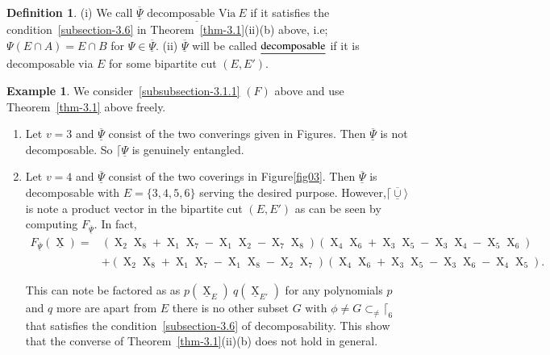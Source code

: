 \documentclass[a4paper,12pt]{article}
\DeclareMathOperator{\x}{\mathrm{X}}
\theoremstyle{definition}
\theoremstyle{underlinethm}
\newtheorem{example}{Example}[section]
\newtheorem{definition}{Definition}[section]
\theoremstyle{underline}
\begin{document}
\begin{definition}\label{def-3.1}
(i) We call $\underline{\overline{\Psi}}$ $\underline{\text{decomposable Via} ~E}$ if it satisfies the condition~\ref{subsection-3.6} in Theorem~\ref{thm-3.1}(ii)(b) above, i.e; $\Psi(E\cap A) = E\cap B$ for $\Psi \in \underline{\overline{\Psi}}$. (ii) $\underline{\overline{\Psi}}$ will be called $\underline{\rm decomposable}$ if it is decomposable via $E$ for some bipartite cut $(E, E')$. 
\end{definition}

\begin{example}%
We consider~\ref{subsubsection-3.1.1} $(F)$ above and use Theorem~\ref{thm-3.1} above freely.
\end{example}

\begin{enumerate}
\item Let $v=3$ and $\underline{\overline{\Psi}}$ consist of the two converings given in Figures. Then $\underline{\overline{\Psi}}$ is not decomposable. So $\lceil\underline{\Psi}$ is genuinely entangled.

\item Let $v=4$ and $\underline{\overline{\Psi}}$ consist of the two coverings in Figure\ref{fig03}. Then $\underline{\overline{\Psi}}$ is decomposable with $E= \{3,4,5,6\}$ serving the desired purpose. However,$\lceil\underline{\overline{\cup}}\rangle$ is note a product vector in the bipartite cut $(E, E')$  as can be seen by computing $F_{\underline{\overline{\Psi}}}$. In fact,
\begin{equation*}
\begin{split}
F_{\underline{\overline{\Psi}}}(\underline{\x}) = &\left(\x_{2} \x_{8} + \x_{1}\x_{7} - \x_{1}\x_{2} -\x_{7}\x_{8}\right)\left(\x_{4}\x_{6} + \x_{3}\x_{5}- \x_{3}\x_{4} - \x_{5}\x_{6} \right)\\
&+ \left(\x_{2}\x_{8} + \x_{1}\x_{7} - \x_{1}\x_{8}-\x_{2}\x_{7}\right) \left(\x_{4} \x_{6} + \x_{3} \x_{5} - \x_{3}\x_{6}-\x_{4} \x_{5}\right).
\end{split}
\end{equation*}

This can note be factored as as $p(\underline{\x}_{E})~q(\underline{\x}_{E'})$ for any polynomials $p$ and $q$ more are apart from $E$ there is no other subset $G$ with $\phi \neq G \subset_{\neq} \lceil_{6}$ that satisfies the condition~\ref{subsection-3.6} of decomposability. This show that the converse of Theorem~\ref{thm-3.1}(ii)(b) does not hold in  general.
\end{enumerate}
\end{document}
